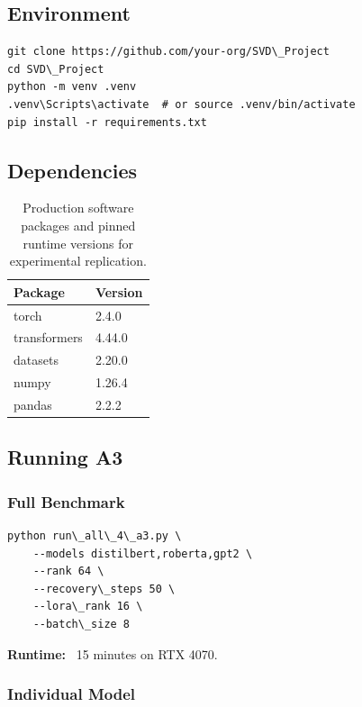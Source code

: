 \subsection{Environment}

\begin{lstlisting}
git clone https://github.com/your-org/SVD\_Project
cd SVD\_Project
python -m venv .venv
.venv\Scripts\activate  # or source .venv/bin/activate
pip install -r requirements.txt
\end{lstlisting}

\subsection{Dependencies}

\begin{table}[H]
\centering
\small
\begin{tabular}{ll}
\toprule
\textbf{Package} & \textbf{Version} \\
\midrule
torch & 2.4.0 \\
transformers & 4.44.0 \\
datasets & 2.20.0 \\
numpy & 1.26.4 \\
pandas & 2.2.2 \\
\bottomrule
\end{tabular}
\caption{Production software packages and pinned runtime versions for experimental replication.}
\label{tab:repro_dependencies}
\end{table}

\subsection{Running A3}

\subsubsection{Full Benchmark}

\begin{lstlisting}
python run\_all\_4\_a3.py \
    --models distilbert,roberta,gpt2 \
    --rank 64 \
    --recovery\_steps 50 \
    --lora\_rank 16 \
    --batch\_size 8
\end{lstlisting}

\textbf{Runtime:} ~15 minutes on RTX 4070.

\subsubsection{Individual Model}

